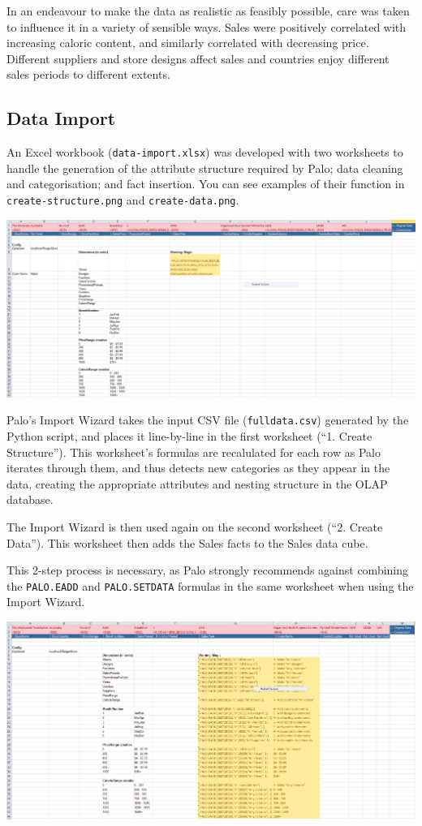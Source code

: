 \documentclass[11pt, a4paper]{article}
\begin{document}
In an endeavour to make the data as realistic as feasibly possible, care was taken to influence it in a variety of sensible ways. Sales were positively correlated with increasing caloric content, and similarly correlated with decreasing price.
Different suppliers and store designs affect sales and countries enjoy different sales periods to different extents.

\subsection*{Data Import}

An Excel workbook (\texttt{data-import.xlsx}) was developed with two worksheets to handle the generation of the attribute structure required by Palo; data cleaning and categorisation; and fact insertion. You can see examples of their function in \texttt{create-structure.png} and \texttt{create-data.png}.

\includegraphics[width=15cm]{diagrams/create-data}

Palo's Import Wizard takes the input CSV file (\texttt{fulldata.csv}) generated by the Python script, and places it line-by-line in the first worksheet (``1. Create Structure'').
This worksheet's formulas are recalulated for each row as Palo iterates through them, and thus detects new categories as they appear in the data, creating the appropriate attributes and nesting structure in the OLAP database.

The Import Wizard is then used again on the second worksheet (``2. Create Data''). This worksheet then adds the Sales facts to the Sales data cube.

This 2-step process is necessary, as Palo strongly recommends against combining the \texttt{PALO.EADD} and \texttt{PALO.SETDATA} formulas in the same worksheet when using the Import Wizard.

\includegraphics[width=15cm]{diagrams/create-structure}
\end{document}
